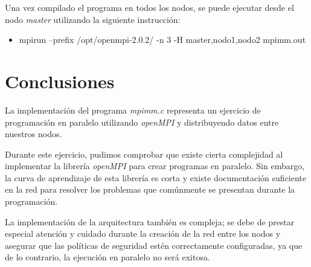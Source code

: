 \documentclass[DIV=calc, paper=letter, fontsize=11pt, twocolumn]{scrartcl}
\begin{document}
Una vez compilado el programa en todos los nodos, se puede ejecutar desde el nodo \textit{master} utilizando la siguiente instrucción:

\begin{itemize}
    \item mpirun --prefix /opt/openmpi-2.0.2/ -n 3 -H master,nodo1,nodo2 mpimm.out
\end{itemize}

\section{Conclusiones}

La implementación del programa \textit{mpimm.c} representa un ejercicio de programación en paralelo utilizando \textit{openMPI} y distribuyendo datos entre nuestros nodos.

Durante este ejercicio, pudimos comprobar que existe cierta complejidad al implementar la librería \textit{openMPI} para crear programas en paralelo. Sin embargo, la curva de aprendizaje de esta librería es corta y existe documentación suficiente en la red para resolver los problemas que comúnmente se presentan durante la programación.

La implementación de la arquitectura también es compleja; se debe de prestar especial atención y cuidado durante la creación de la red entre los nodos y asegurar que las políticas de seguridad estén correctamente configuradas, ya que de lo contrario, la ejecución en paralelo no será exitosa.
\end{document}
